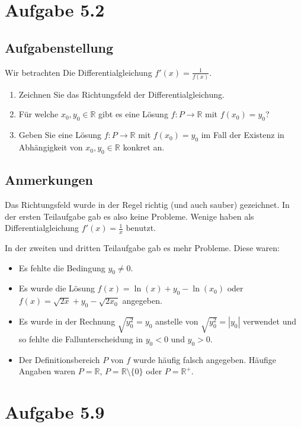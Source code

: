 \documentclass[a4paper]{article}
\newcommand*{\R}{\mathbb R}
\begin{document}
\section{Aufgabe 5.2}

\subsection{Aufgabenstellung}

Wir betrachten Die Differentialgleichung $f'(x)=\frac{1}{f(x)}$.

\begin{enumerate}
  \item Zeichnen Sie das Richtungsfeld der Differentialgleichung.
  \item Für welche $x_0,y_0\in\R$ gibt es eine Lösung $f:P\to\R$ mit $f(x_0)=y_0$?
  \item Geben Sie eine Lösung $f:P\to\R$ mit $f(x_0)=y_0$ im Fall der Existenz in Abhängigkeit von $x_0,y_0\in\R$ konkret an.
\end{enumerate}

\subsection{Anmerkungen}

Das Richtungsfeld wurde in der Regel richtig (und auch sauber) gezeichnet. In der ersten Teilaufgabe gab es also keine Probleme. Wenige haben als Differentialgleichung $f'(x)=\frac{1}{x}$ benutzt.

In der zweiten und dritten Teilaufgabe gab es mehr Probleme. Diese waren:

\begin{itemize}
  \item Es fehlte die Bedingung $y_0\neq 0$.
  \item Es wurde die Lösung $f(x)=\ln(x)+y_0-\ln(x_0)$ oder $f(x)=\sqrt{2x}+y_0-\sqrt{2x_0}$ angegeben.
  \item Es wurde in der Rechnung $\sqrt{y_0^2}=y_0$ anstelle von $\sqrt{y_0^2}=|y_0|$ verwendet und so fehlte die Fallunterscheidung in $y_0 < 0$ und $y_0>0$.
  \item Der Definitionsbereich $P$ von $f$ wurde häufig falsch angegeben. Häufige Angaben waren $P=\R$, $P=\R\setminus\{0\}$ oder $P=\R^{+}$.
\end{itemize}

\section{Aufgabe 5.9}
\end{document}
